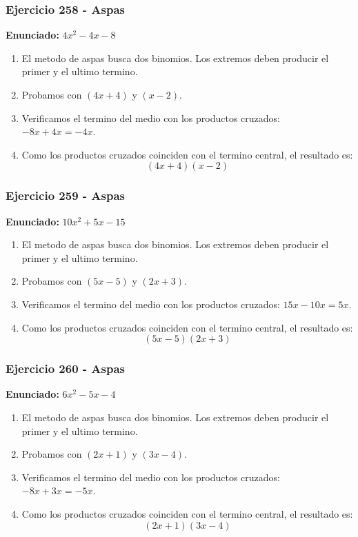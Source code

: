 \documentclass[11pt,a4paper]{article}
\begin{document}
\vspace{0.2cm}
\subsubsection*{Ejercicio 258 - Aspas}
\textbf{Enunciado:} $ 4 x^{2} - 4 x - 8 $\par
\begin{enumerate}[leftmargin=2em]
\item El metodo de aspas busca dos binomios. Los extremos deben producir el primer y el ultimo termino.
\item Probamos con \((4 x + 4)\) y \((x - 2)\).
\item Verificamos el termino del medio con los productos cruzados: \(- 8 x+4 x=- 4 x\).
\item Como los productos cruzados coinciden con el termino central, el resultado es: \[\boxed{\left(4 x + 4\right)\left(x - 2\right)}\]
\end{enumerate}

\vspace{0.2cm}
\subsubsection*{Ejercicio 259 - Aspas}
\textbf{Enunciado:} $ 10 x^{2} + 5 x - 15 $\par
\begin{enumerate}[leftmargin=2em]
\item El metodo de aspas busca dos binomios. Los extremos deben producir el primer y el ultimo termino.
\item Probamos con \((5 x - 5)\) y \((2 x + 3)\).
\item Verificamos el termino del medio con los productos cruzados: \(15 x- 10 x=5 x\).
\item Como los productos cruzados coinciden con el termino central, el resultado es: \[\boxed{\left(5 x - 5\right)\left(2 x + 3\right)}\]
\end{enumerate}

\vspace{0.2cm}
\subsubsection*{Ejercicio 260 - Aspas}
\textbf{Enunciado:} $ 6 x^{2} - 5 x - 4 $\par
\begin{enumerate}[leftmargin=2em]
\item El metodo de aspas busca dos binomios. Los extremos deben producir el primer y el ultimo termino.
\item Probamos con \((2 x + 1)\) y \((3 x - 4)\).
\item Verificamos el termino del medio con los productos cruzados: \(- 8 x+3 x=- 5 x\).
\item Como los productos cruzados coinciden con el termino central, el resultado es: \[\boxed{\left(2 x + 1\right)\left(3 x - 4\right)}\]
\end{enumerate}
\end{document}
